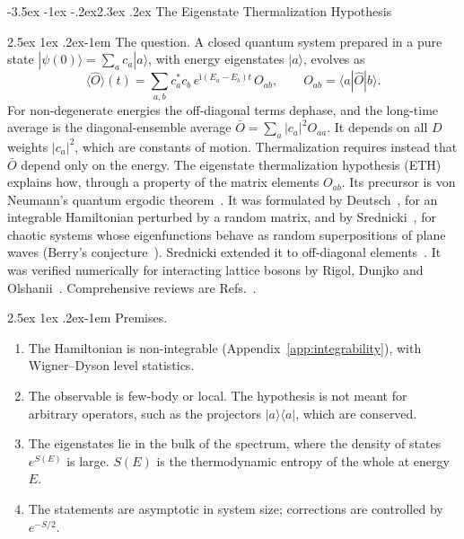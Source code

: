 \documentclass[10pt,a4paper]{article}
\makeatletter
\renewcommand{\section}{\@startsection{section}{1}{\z@}%
  {-3.5ex \@plus -1ex \@minus -.2ex}{2.3ex \@plus .2ex}%
  {\normalfont\fontsize{18pt}{22pt}\selectfont\bfseries}}
\renewcommand{\paragraph}{\@startsection{paragraph}{4}{\z@}%
  {2.5ex \@plus 1ex \@minus .2ex}{-1em}%
  {\normalfont\fontsize{14pt}{17pt}\selectfont\bfseries}}
\newcommand{\ii}{\mathrm{i}}
\makeatother
\begin{document}
\section{The Eigenstate Thermalization Hypothesis}
\label{app:eth}

\paragraph{The question.}
A closed quantum system prepared in a pure state $ |\psi(0)\rangle = \sum_a c_a |a\rangle $, with energy eigenstates $ |a\rangle $, evolves as
\begin{equation}
  \langle \hat O \rangle(t) = \sum_{a,b} c_a^* c_b \, e^{\ii(E_a - E_b)t} \, O_{ab} ,
  \qquad
  O_{ab} = \langle a | \hat O | b \rangle .
  \label{eq:eth-evolution}
\end{equation}
For non-degenerate energies the off-diagonal terms dephase, and the long-time average is the diagonal-ensemble average $ \bar O = \sum_a |c_a|^2 O_{aa} $.
It depends on all $ D $ weights $ |c_a|^2 $, which are constants of motion.
Thermalization requires instead that $ \bar O $ depend only on the energy.
The eigenstate thermalization hypothesis (ETH) explains how, through a property of the matrix elements $ O_{ab} $.
Its precursor is von Neumann's quantum ergodic theorem~\cite{vonNeumann1929,Goldstein2010}.
It was formulated by Deutsch~\cite{Deutsch1991}, for an integrable Hamiltonian perturbed by a random matrix, and by Srednicki~\cite{Srednicki1994}, for chaotic systems whose eigenfunctions behave as random superpositions of plane waves (Berry's conjecture~\cite{Berry1977}). Srednicki extended it to off-diagonal elements~\cite{Srednicki1999}. It was verified numerically for interacting lattice bosons by Rigol, Dunjko and Olshanii~\cite{Rigol2008}. Comprehensive reviews are Refs.~\cite{DAlessio2016,Deutsch2018}.

\paragraph{Premises.}
\begin{enumerate}[label=(P\arabic*), leftmargin=3.0em]
\item The Hamiltonian is non-integrable (Appendix~\ref{app:integrability}), with Wigner--Dyson level statistics.
\item The observable is few-body or local. The hypothesis is not meant for arbitrary operators, such as the projectors $ |a\rangle\langle a| $, which are conserved.
\item The eigenstates lie in the bulk of the spectrum, where the density of states $ e^{S(E)} $ is large. $ S(E) $ is the thermodynamic entropy of the whole at energy $ E $.
\item The statements are asymptotic in system size; corrections are controlled by $ e^{-S/2} $.
\end{enumerate}
\end{document}

